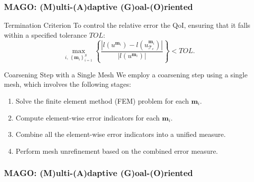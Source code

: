 \begin{frame}
\frametitle{MAGO: (M)ulti-(A)daptive (G)oal-(O)riented}

\begin{block}{Termination Criterion}
    To control the relative error the QoI, ensuring that it falls within a specified tolerance \(TOL\):
    \begin{equation}
        \max_{i, \, \left\{\mathbf{m}_i\right\}_{i=1}^S} \left\{ \frac{\left|l\left(u^{\mathbf{m}_i}\right) - l\left(u^{\mathbf{m}_i}_{\mathcal{T}_{c}}\right)\right|}{\left|l\left(u^{\mathbf{m}_i}\right)\right|}\right\} < TOL. 
    \end{equation}
\end{block}

\vspace{1mm}

\begin{block}{Coarsening Step with a Single Mesh}
    \vspace{2mm}
    We employ a coarsening step using a single mesh, which involves the following stages:
    \begin{enumerate}
        \item Solve the finite element method (FEM) problem for each \(\mathbf{m}_i\).
        \item Compute element-wise error indicators for each \(\mathbf{m}_i\).
        \item Combine all the element-wise error indicators into a unified measure.
        \item Perform mesh unrefinement based on the combined error measure.
    \end{enumerate}
\end{block}

\end{frame}

\begin{frame}
    \frametitle{MAGO: (M)ulti-(A)daptive (G)oal-(O)riented}
    \vspace{-2mm}

    \vspace{-1mm}

    \begin{figure}
        \centering
        
    \end{figure}
\end{frame}